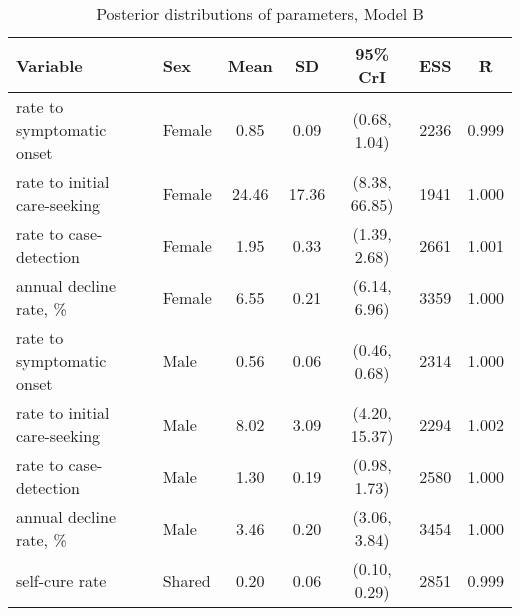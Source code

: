 \begin{table}[h]

\caption{\label{tab:}Posterior distributions of parameters, Model B}
\centering
\begin{tabular}[t]{llccccc}
\toprule
Variable & Sex & Mean & SD & 95\% CrI & ESS & \^{R}\\
\midrule
rate to symptomatic onset & Female & 0.85 & 0.09 & (0.68, 1.04) & 2236 & 0.999\\
rate to initial care-seeking & Female & 24.46 & 17.36 & (8.38, 66.85) & 1941 & 1.000\\
rate to case-detection & Female & 1.95 & 0.33 & (1.39, 2.68) & 2661 & 1.001\\
annual decline rate, \% & Female & 6.55 & 0.21 & (6.14, 6.96) & 3359 & 1.000\\
\addlinespace
rate to symptomatic onset & Male & 0.56 & 0.06 & (0.46, 0.68) & 2314 & 1.000\\
rate to initial care-seeking & Male & 8.02 & 3.09 & (4.20, 15.37) & 2294 & 1.002\\
rate to case-detection & Male & 1.30 & 0.19 & (0.98, 1.73) & 2580 & 1.000\\
annual decline rate, \% & Male & 3.46 & 0.20 & (3.06, 3.84) & 3454 & 1.000\\
\addlinespace
self-cure rate & Shared & 0.20 & 0.06 & (0.10, 0.29) & 2851 & 0.999\\
\bottomrule
\end{tabular}
\end{table}
